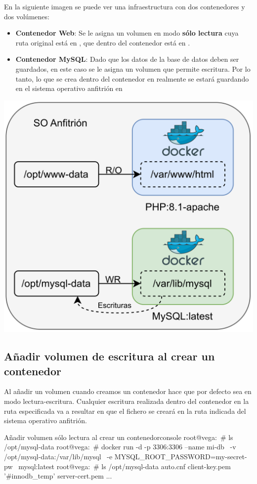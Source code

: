 En la siguiente imagen se puede ver una infraestructura con dos contenedores y dos volúmenes:
\begin{itemize}
    \item \textbf{Contenedor Web}: Se le asigna un volumen en modo \textbf{sólo lectura} cuya ruta original está en , que dentro del contenedor está en .
    \item \textbf{Contenedor MySQL}: Dado que los datos de la base de datos deben ser guardados, en este caso se le asigna un volumen que permite escritura. Por lo tanto, lo que se crea dentro del contenedor en  realmente se estará guardando en el sistema operativo anfitrión en 
\end{itemize}
\begin{center}
    \includegraphics[width=0.65\linewidth]{img/docker/volumes.png}
\end{center}


\subsection{Añadir volumen de escritura al crear un contenedor}

Al añadir un volumen cuando creamos un contenedor hace que por defecto sea en modo lectura-escritura. Cualquier escritura realizada dentro del contenedor en la ruta especificada va a resultar en que el fichero se creará en la ruta indicada del sistema operativo anfitrión.

\begin{mycode}{Añadir volumen sólo lectura al crear un contenedor}{console}{{\small }}
root@vega:~# ls /opt/mysql-data
root@vega:~# docker run -d -p 3306:3306 --name mi-db \
    -v /opt/mysql-data:/var/lib/mysql \
    -e MYSQL_ROOT_PASSWORD=my-secret-pw \
    mysql:latest
root@vega:~# ls /opt/mysql-data
auto.cnf      client-key.pem      '#innodb_temp'      server-cert.pem   ...
\end{mycode}

